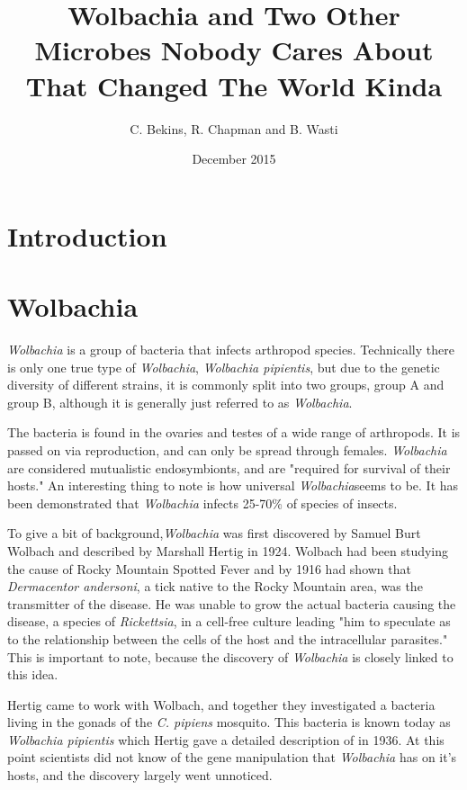 \documentclass[twocolumn]{article}
\begin{document}
\title{Wolbachia and Two Other Microbes Nobody Cares About That Changed The World Kinda}
    \author{C. Bekins, R. Chapman and B. Wasti}
    \date{December 2015}
    \maketitle

\section*{Introduction}
\section*{Wolbachia}
\textit{Wolbachia} is a group of bacteria that infects arthropod species. Technically there is only one true type of \textit{Wolbachia}, \textit{Wolbachia pipientis}, but due to the genetic diversity of different strains, it is commonly split into two groups, group A and group B, although it is generally just referred to as \textit{Wolbachia}.

The bacteria is found in the ovaries and testes of a wide range of arthropods.\cite{Wbio} It is passed on via reproduction, and can only be spread through females. \textit{Wolbachia} are considered mutualistic endosymbionts, and are "required for survival of their hosts."\cite{Wdisc_nem} An interesting thing to note is how universal \textit{Wolbachia}seems to be. It has been demonstrated that \textit{Wolbachia} infects 25-70\% of species of insects.\cite{Wdisc_nem}

To give a bit of background,\textit{Wolbachia} was first discovered by Samuel Burt Wolbach and described by Marshall Hertig in 1924.\cite{Winit} Wolbach had been studying the cause of Rocky Mountain Spotted Fever and by 1916 had shown that \textit{Dermacentor andersoni}, a tick native to the Rocky Mountain area, was the transmitter of the disease.\cite{wolbachia} He was unable to grow the actual bacteria causing the disease, a species of \textit{Rickettsia}, in a cell-free culture leading "him to speculate as to the relationship between the cells of the host and the intracellular parasites."\cite{wolbachia} This is important to note, because the discovery of \textit{Wolbachia} is closely linked to this idea.

Hertig came to work with Wolbach, and together they investigated a bacteria living in the gonads of the \textit{C. pipiens} mosquito. This bacteria is known today as \textit{Wolbachia pipientis} which Hertig gave a detailed description of in 1936.\cite{Wdiscription} At this point scientists did not know of the gene manipulation that \textit{Wolbachia} has on it's hosts, and the discovery largely went unnoticed.
\end{document}
